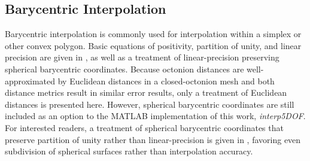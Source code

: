 \documentclass[preprint,12pt]{elsarticle}
\begin{document}

    


\subsection{Barycentric Interpolation} \label{sec:methods:bary}

Barycentric interpolation is commonly used for interpolation within a simplex or other convex polygon. Basic equations of positivity, partition of unity, and linear precision are given in \cite{Langer2006SphericalCoordinates}, as well as a treatment of linear-precision preserving spherical barycentric coordinates. Because octonion distances are well-approximated by Euclidean distances in a closed-octonion mesh and both distance metrics result in similar error results, only a treatment of Euclidean distances is presented here. However, spherical barycentric coordinates are still included as an option to the MATLAB implementation of this work, \textit{interp5DOF}. For interested readers, a treatment of spherical barycentric coordinates that preserve partition of unity rather than linear-precision is given in \cite{Lei2020ASystems}, favoring even subdivision of spherical surfaces rather than interpolation accuracy.
\end{document}

